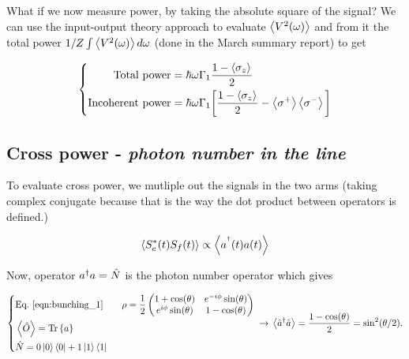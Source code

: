   What if we  now measure power, by taking the  absolute square of the signal? We  can use the
  input-output theory approach to  evaluate $ \left\langle V^2(\omega) \right\rangle $ and from  it the total power
  $ 1/Z\int\left\langle V^2(\omega) \right\rangle d\omega $ (done in the March summary report) to get
  
  \begin{equation}\label{eqn:dynamics1}
    \left\lbrace\begin{aligned}\text{Total power} &= \hbar\omega\Gamma_1  \frac{1-{{\left\langle \sigma_z \right\rangle} }_{}}{2}\\
      \text{Incoherent power} &= \hbar\omega\Gamma_1  \bigg[\frac{1-{{\left\langle \sigma_z \right\rangle} }_{}}{2}-\left\langle \sigma^{+} \right\rangle\left\langle \sigma^{-} \right\rangle\bigg]
    \end{aligned}\right.
  \end{equation}
  
  \noindent {}

  
  \subsection{Cross power - \textit{photon number in the line}}
  To  evaluate cross  power, we  mutliple out  the  signals in  the two  arms (taking  complex
  conjugate because  that is the  way the dot product  between operators is  defined.) 
  
  \begin{equation}\label{key}
    \left\langle S_e^{*}(t) S_{f}(t) \right\rangle \propto \left\langle a^{^{\dagger}}(t)a(t) \right\rangle
  \end{equation}
  
  \noindent Now, operator $ a^{\dagger} a = \hat{N} $ is the photon number operator which gives

  \begin{equation}\label{key}
    \ialigned{
      &\text{Eq.~\eqref{eqn:bunching_1}}\qquad                \rho                 =
      \frac{1}{2}\imatrix{1+\cos(\theta)}{e^{-i\phi}\sin(\theta)}{e^{i\phi}\sin(\theta)}{1-\cos(\theta)} \\
      & \iaverage{\hat{O}} = \trace{a}\\%
      & \hat{N} = 0\ketbra{0}{0} + 1\ketbra{1}{1}
    } \ira \iaverage{\hat{a}^{\dagger}\hat{a}} = \frac{1-\cos(\theta)}{2} = \sin^2(\theta/2).
  \end{equation}
  
